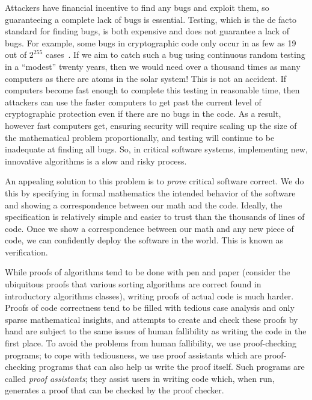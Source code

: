 Attackers have financial incentive to find any bugs and exploit them, so guaranteeing a complete lack of bugs is essential.
Testing, which is the de facto standard for finding bugs, is both expensive and does not guarantee a lack of bugs.
For example, some bugs in cryptographic code only occur in as few as 19 out of $2^{255}$ cases~\cite{curve25519-donna-commit-correct-bounds}.
If we aim to catch such a bug using continuous random testing in a ``modest'' twenty years, then we would need over a thousand times as many computers as there are atoms in the solar system!
This is not an accident.
If computers become fast enough to complete this testing in reasonable time, then attackers can use the faster computers to get past the current level of cryptographic protection even if there are no bugs in the code.
As a result, however fast computers get, ensuring security will require scaling up the size of the mathematical problem proportionally, and testing will continue to be inadequate at finding all bugs.
So, in critical software systems, implementing new, innovative algorithms is a slow and risky process.






An appealing solution to this problem is to \emph{prove} critical software correct.
We do this by specifying in formal mathematics the intended behavior of the software and showing a correspondence between our math and the code.
Ideally, the specification is relatively simple and easier to trust than the thousands of lines of code.
Once we show a correspondence between our math and any new piece of code, we can confidently deploy the software in the world.
This is known as verification.

While proofs of algorithms tend to be done with pen and paper (consider the ubiquitous proofs that various sorting algorithms are correct found in introductory algorithms classes), writing proofs of actual code is much harder.
Proofs of code correctness tend to be filled with tedious case analysis and only sparse mathematical insights, and attempts to create and check these proofs by hand are subject to the same issues of human fallibility as writing the code in the first place.
To avoid the problems from human fallibility, we use proof-checking programs; to cope with tediousness, we use proof assistants which are proof-checking programs that can also help us write the proof itself.
Such programs are called \emph{proof assistants}; they assist users in writing code which, when run, generates a proof that can be checked by the proof checker.

